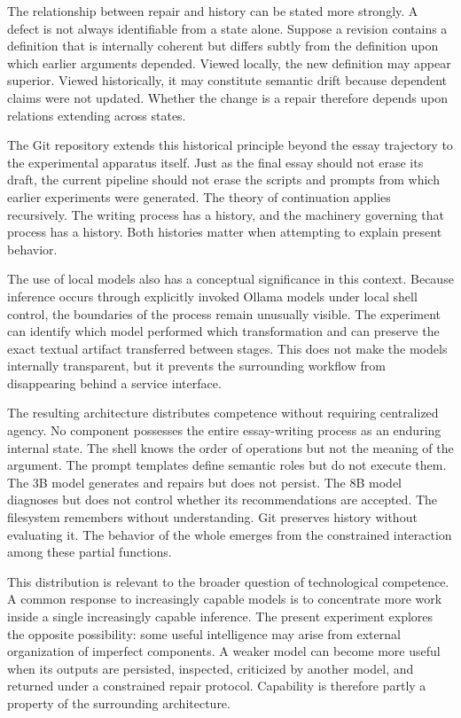 \documentclass[11pt]{article}
\begin{document}
The relationship between repair and history can be stated more strongly. A defect is not always identifiable from a state alone. Suppose a revision contains a definition that is internally coherent but differs subtly from the definition upon which earlier arguments depended. Viewed locally, the new definition may appear superior. Viewed historically, it may constitute semantic drift because dependent claims were not updated. Whether the change is a repair therefore depends upon relations extending across states.

The Git repository extends this historical principle beyond the essay trajectory to the experimental apparatus itself. Just as the final essay should not erase its draft, the current pipeline should not erase the scripts and prompts from which earlier experiments were generated. The theory of continuation applies recursively. The writing process has a history, and the machinery governing that process has a history. Both histories matter when attempting to explain present behavior.

The use of local models also has a conceptual significance in this context. Because inference occurs through explicitly invoked Ollama models under local shell control, the boundaries of the process remain unusually visible. The experiment can identify which model performed which transformation and can preserve the exact textual artifact transferred between stages. This does not make the models internally transparent, but it prevents the surrounding workflow from disappearing behind a service interface.

The resulting architecture distributes competence without requiring centralized agency. No component possesses the entire essay-writing process as an enduring internal state. The shell knows the order of operations but not the meaning of the argument. The prompt templates define semantic roles but do not execute them. The 3B model generates and repairs but does not persist. The 8B model diagnoses but does not control whether its recommendations are accepted. The filesystem remembers without understanding. Git preserves history without evaluating it. The behavior of the whole emerges from the constrained interaction among these partial functions.

This distribution is relevant to the broader question of technological competence. A common response to increasingly capable models is to concentrate more work inside a single increasingly capable inference. The present experiment explores the opposite possibility: some useful intelligence may arise from external organization of imperfect components. A weaker model can become more useful when its outputs are persisted, inspected, criticized by another model, and returned under a constrained repair protocol. Capability is therefore partly a property of the surrounding architecture.
\end{document}
